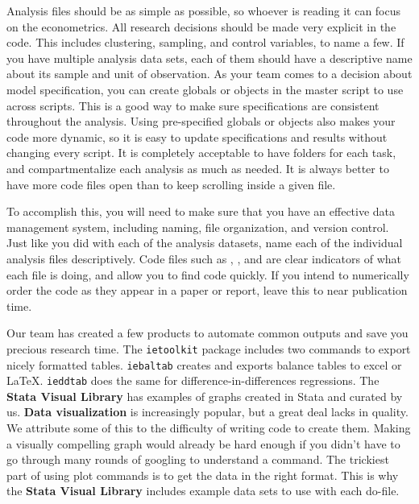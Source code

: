 Analysis files should be as simple as possible, so whoever is reading it can focus on the econometrics.
All research decisions should be made very explicit in the code.
This includes clustering, sampling, and control variables, to name a few. 
If you have multiple analysis data sets, each of them should have a descriptive name about its sample and unit of observation.
As your team comes to a decision about model specification, you can create globals or objects in the master script to use across scripts.
This is a good way to make sure specifications are consistent throughout the analysis. 
Using pre-specified globals or objects also makes your code more dynamic, so it is easy to update specifications and results without changing every script.
It is completely acceptable to have folders for each task, and compartmentalize each analysis as much as needed.
It is always better to have more code files open than to keep scrolling inside a given file.

To accomplish this, you will need to make sure that you have an effective data management system, including naming, file organization, and version control.
Just like you did with each of the analysis datasets, name each of the individual analysis files descriptively.
Code files such as , , and  
are clear indicators of what each file is doing, and allow you to find code quickly.
If you intend to numerically order the code as they appear in a paper or report, 
leave this to near publication time.

Our team has created a few products to automate common outputs and save you 
precious research time.
The \texttt{ietoolkit} package includes two commands to export nicely formatted tables.
\texttt{iebaltab} creates and exports balance tables to excel or {\LaTeX}. 
\texttt{ieddtab} does the same for difference-in-differences regressions.
The \textbf{Stata Visual Library}
has examples of graphs created in Stata and curated by us.
\textbf{Data visualization} 
is increasingly popular, but a great deal lacks in quality.\cite{healy2018data,wilke2019fundamentals}
We attribute some of this to the difficulty of writing code to create them.
Making a visually compelling graph would already be hard enough if you didn't have to go through many rounds of googling to understand a command.
The trickiest part of using plot commands is to get the data in the right format.
This is why the \textbf{Stata Visual Library} includes example data sets to use 
with each do-file.

